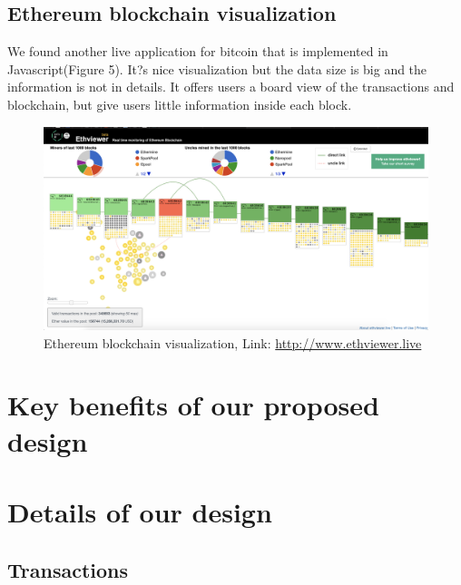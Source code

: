 \documentclass[journal, a4paper]{IEEEtran}
\begin{document}
\subsection{Ethereum blockchain visualization}
We found another live application for bitcoin that is implemented in Javascript(Figure 5). It?s nice visualization but the data size is big and the information is not in details. It offers users a board view of the transactions and blockchain, but give users little information inside each block.
\begin{figure}[!hbt]
		\begin{center}
		\includegraphics[width=\columnwidth]{ethereum.png}
		\caption{Ethereum blockchain visualization, Link: \href{http://www.ethviewer.live}{http://www.ethviewer.live}}
		\label{fig:Ethereum blockchain visualization}
		\end{center}
	\end{figure}

\section{Key benefits of our proposed design}

\section{Details of our design}
\subsection{Transactions}
\end{document}
